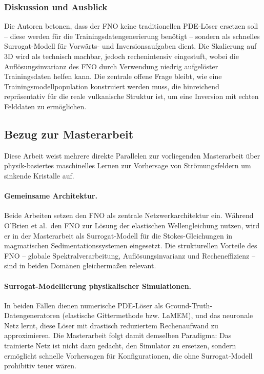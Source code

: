 \documentclass[a4paper,12pt]{article}
\begin{document}
\subsubsection*{Diskussion und Ausblick}

Die Autoren betonen, dass der FNO keine traditionellen PDE-Löser ersetzen soll -- diese 
werden für die Trainingsdatengenerierung benötigt -- sondern als schnelles Surrogat-Modell 
für Vorwärts- und Inversionsaufgaben dient. Die Skalierung auf 3D wird als technisch 
machbar, jedoch rechenintensiv eingestuft, wobei die Auflösungsinvarianz des FNO durch 
Verwendung niedrig aufgelöster Trainingsdaten helfen kann. Die zentrale offene Frage 
bleibt, wie eine Trainingsmodellpopulation konstruiert werden muss, die hinreichend 
repräsentativ für die reale vulkanische Struktur ist, um eine Inversion mit echten 
Felddaten zu ermöglichen.

\subsection*{Bezug zur Masterarbeit}

Diese Arbeit weist mehrere direkte Parallelen zur vorliegenden Masterarbeit über 
physik-basiertes maschinelles Lernen zur Vorhersage von Strömungsfeldern um sinkende 
Kristalle auf.

\paragraph{Gemeinsame Architektur.}
Beide Arbeiten setzen den FNO als zentrale Netzwerkarchitektur ein. Während O'Brien 
et al.\ den FNO zur Lösung der elastischen Wellengleichung nutzen, wird er in der 
Masterarbeit als Surrogat-Modell für die Stokes-Gleichungen in magmatischen 
Sedimentationssystemen eingesetzt. Die strukturellen Vorteile des FNO -- globale 
Spektralverarbeitung, Auflösungsinvarianz und Recheneffizienz -- sind in beiden 
Domänen gleichermaßen relevant.

\paragraph{Surrogat-Modellierung physikalischer Simulationen.}
In beiden Fällen dienen numerische PDE-Löser als Ground-Truth-Datengeneratoren 
(elastische Gittermethode bzw. LaMEM), und das neuronale Netz lernt, diese Löser 
mit drastisch reduziertem Rechenaufwand zu approximieren. Die Masterarbeit folgt 
damit demselben Paradigma: Das trainierte Netz ist nicht dazu gedacht, den Simulator 
zu ersetzen, sondern ermöglicht schnelle Vorhersagen für Konfigurationen, die ohne 
Surrogat-Modell prohibitiv teuer wären.
\end{document}
